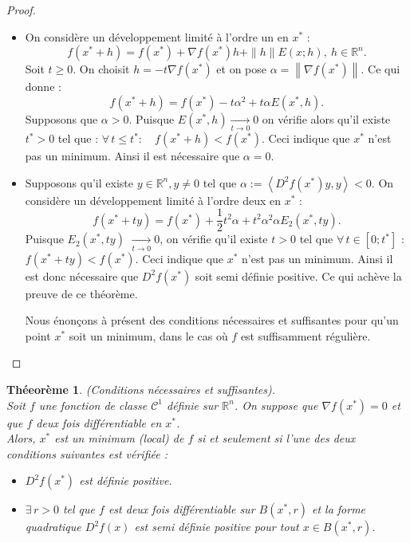 \documentclass[12pt,a4paper,openay]{book}
\numberwithin{equation}{chapter}
\newtheorem{theo}{Th\'eeor\`eme}[chapter]
\newcommand{\R}{\mathbb{R}}
\let\oldforall\forall
\renewcommand{\forall}{\oldforall\,}
\let\oldexists\exists
\renewcommand{\exists}{\oldexists\,}
\begin{document}
	\begin{proof}
	\hfill
	\begin{itemize}
	\item[i)] On consid\`ere un d\'eveloppement limit\'e \`a l'ordre un en $x^*$ :
		$$
		f\left(x^*+h\right)=f(x^*)+\nabla f(x^*) h+\|h\| E\left(x ; h\right) ,\  h\in\R^n .
		$$	
		Soit $t \geq 0$. On choisit $h=-t \nabla f(x^*)$ et on pose $\alpha=\left\|\nabla f(x^*)\right\|$.
		Ce qui donne :
		$$
		f\left(x^*+h\right)=f(x^*)-t \alpha^2+t \alpha E(x^*,h) .
		$$	
		Supposons que $\alpha>0$. Puisque $E(x^*,h) \underset{t \to 0}{\longrightarrow} 0$ on v\'erifie alors qu'il existe $t^*>0$ tel que :
		$\forall t \leq t^*: \quad f\left(x^*+h\right)<f(x^*)$. Ceci indique que $x^*$ n'est pas un minimum. Ainsi il est n\'ecessaire que $\alpha=0$.
		\item[ii)] Supposons qu'il existe $y \in \R^n, y \neq 0$ tel que $\alpha:=\left\langle D^2 f(x^*) y, y\right\rangle<0$. On consid\`ere un d\'eveloppement limit\'e \`a l'ordre deux en $x^*$ :
		$$
		f\left(x^*+t y\right)=f(x^*)+ \frac{1}{2} t^2 \alpha+t^2 \alpha^2 \alpha E_2(x^*,ty) .
		$$	
		Puisque $E_2(x^*, ty)$ $\underset{t \to 0}{\longrightarrow} 0$, on v\'erifie qu'il existe $t>0$ tel que $\forall t \in\left[0 ; t^*\right]$ : $f\left(x^*+t y\right)<f(x^*)$. Ceci indique que $x^*$ n'est pas un minimum.
		Ainsi il est donc n\'ecessaire que $D^2 f(x^*)$ soit semi définie positive.
		Ce qui ach\`eve la preuve de ce th\'eor\`eme.
		
		Nous \'enon\c{c}ons \`a pr\'esent des conditions n\'ecessaires et suffisantes pour qu'un point $x^*$ soit un minimum, dans le cas o\`u $f$ est suffisamment r\'eguli\`ere.
	\end{itemize}
	\end{proof}
	
	\begin{theo}
	(Conditions n\'ecessaires et suffisantes).\\
		Soit $f$ une fonction de classe $\mathcal{C}^1$ d\'efinie sur $\R^n$. On suppose que $\nabla f(x^*)=0$ et que $f$ deux fois diff\'erentiable en $x^*$.\\
		Alors, $x^*$ est un minimum (local) de $f$ si et seulement si l'une des deux conditions suivantes est v\'erifi\'ee :
		\begin{itemize}
		\item[i)] $D^2 f(x^*)$ est d\'efinie positive.
				\item[ii)] $\exists r>0$ tel que $f$ est deux fois diff\'erentiable sur $B(x^*,r)$ et la forme quadratique $D^2 f(x)$ est semi définie positive pour tout $x \in B(x^*,r)$.
		\end{itemize}
	\end{theo}
	
\end{document}
